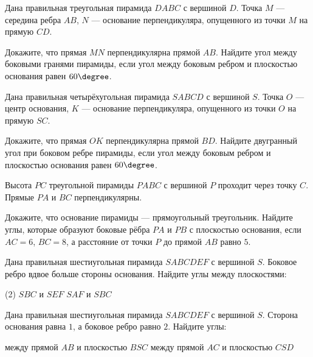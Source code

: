 \begin{class}[number=4]
	\begin{listofex}
		\item Дана правильная треугольная пирамида \(DABC\) с вершиной \(D\). Точка \(M\) --- середина ребра \(AB\), \(N\) --- основание перпендикуляра, опущенного из точки \(M\) на прямую \(CD\).
		\begin{tasks}
			\task Докажите, что прямая \(MN\) перпендикулярна прямой \(AB\).
			\task Найдите угол между боковыми гранями пирамиды, если угол между боковым ребром и плоскостью основания равен \(60\degree \).
		\end{tasks}
		\item Дана правильная четырёхугольная пирамида \(SABCD\) с вершиной \(S\). Точка \(O\) --- центр основания, \(K\) --- основание перпендикуляра, опущенного из точки \(O\) на прямую \(SC\).
		\begin{tasks}
			\task Докажите, что прямая \(OK\) перпендикулярна прямой \(BD\).
			\task Найдите двугранный угол при боковом ребре пирамиды, если угол между боковым ребром и плоскостью основания равен \(60\degree \).
		\end{tasks}
		\item Высота \(PC\) треугольной пирамиды \(PABC\) с вершиной \(P\) проходит через точку \(C\). Прямые \(PA\) и \(BC\) перпендикулярны.
		\begin{tasks}
			\task Докажите, что основание пирамиды --- прямоугольный треугольник.
			\task Найдите углы, которые образуют боковые рёбра \(PA\) и \(PB\) с плоскостью основания, если \(AC = 6\), \(BC = 8\), а расстояние от точки \(P\) до прямой \(AB\) равно \(5\).
		\end{tasks}
	\end{listofex}
\end{class}

\begin{homework}[number=2]
	\begin{listofex}
		\item Дана правильная шестиугольная пирамида \(SABCDEF\) с вершиной \(S\). Боковое ребро вдвое больше стороны основания. Найдите углы между плоскостями:
		\begin{tasks}(2)
			\task \( SBC \) и \(SEF\)
			\task \( SAF \) и \(SBC\)
		\end{tasks}
		\item Дана правильная шестиугольная пирамида \(SABCDEF\) с вершиной \(S\). Сторона основания равна \(1\), а боковое ребро равно \(2\). Найдите углы:
		\begin{tasks}
			\task между прямой \(AB\) и плоскостью \(BSC\)
			\task между прямой \(AC\) и плоскостью \(CSD\)
		\end{tasks}
		\item 
		\begin{tasks}
			\task 
			\task 
		\end{tasks}
	\end{listofex}
\end{homework}

